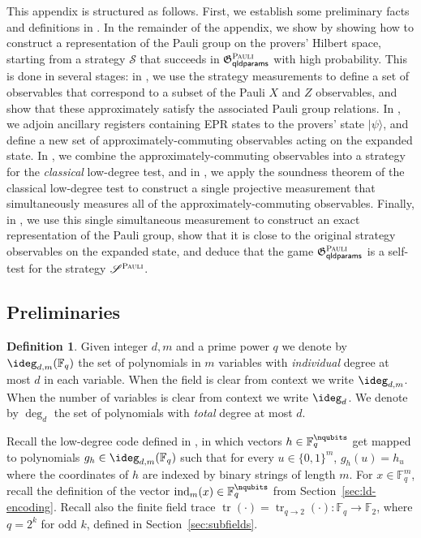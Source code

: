 \documentclass[11pt]{article}
\theoremstyle{definition}
\newtheorem{definition}[theorem]{Definition}
\newcommand{\ket}[1]{|#1\rangle}
\newcommand{\F}{\ensuremath{\mathbb{F}}}
\newcommand{\ind}{\ensuremath{\mathrm{ind}}}
\DeclareMathOperator{\tr}{tr}
\newcommand{\game}{\mathfrak{G}}
\newcommand{\strategy}{\mathscr{S}}
\newcommand{\gamestyle}[1]{\ensuremath{\textsc{#1}}\xspace}
\newcommand{\pauli}{\gamestyle{Pauli}}
\newcommand{\qldparams}{\mathsf{qldparams}}
\begin{document}
This appendix is structured as follows. First, we establish some preliminary facts and definitions 
in . In the remainder of the appendix, we
show  by showing how to construct a representation of
the Pauli group on the provers' Hilbert space, starting from a
strategy $\strategy$ that succeeds in $\game^\pauli_\qldparams$ with
high probability. This is done in several stages: in
, we use the strategy measurements to define a
set of observables that correspond to a subset of the Pauli $X$ and
$Z$ observables, and show that these
approximately satisfy the associated Pauli group relations. In ,
we adjoin ancillary registers containing EPR states to the provers'
state $\ket{\psi}$, and define a new set of approximately-commuting
observables acting on the expanded state. In , we
combine the approximately-commuting observables into a strategy for
the \emph{classical} low-degree test, and in , we
apply the soundness theorem of the classical low-degree test to
construct a single projective measurement that simultaneously measures all of the
approximately-commuting observables. Finally, in
, we use this single simultaneous measurement to
construct an exact representation of the Pauli group, show that it
is close to the original strategy observables on the expanded state, and deduce that the game $\game^\pauli_\qldparams$ is a self-test for the strategy $\strategy^\pauli$.

\subsection{Preliminaries}
\label{sec:qld-prelim}


\begin{definition}
Given integer $d,m$ and a prime power $q$ we denote by $\ideg_{d,m}(\F_q)$ the set of polynomials in $m$ variables
  with \emph{individual} degree at most $d$ in each variable. When the field is clear from context we write $\ideg_{d,m}$. 	
	When
  the number of variables is clear from context we
  write $\ideg_d$. We denote by $\deg_{d}$ the set of polynomials with
  \emph{total} degree at most $d$.
\end{definition}

Recall the low-degree code defined in , in which vectors $h \in \F_q^\nqubits$ get mapped to polynomials $g_h \in \ideg_{d,m}(\F_q)$ such that for every $u \in \{0,1\}^m$, $g_h(u) = h_u$ where the coordinates of $h$ are indexed by binary strings of length $m$. For $x\in \F_q^m$, recall the definition of the vector $\ind_m(x) \in \F_q^\nqubits$ from Section~\ref{sec:ld-encoding}. Recall also the finite field trace $\tr(\cdot)=\tr_{q\to 2}(\cdot):\F_q\to\F_2$, where $q=2^k$ for odd $k$, defined in Section~\ref{sec:subfields}. 
\end{document}
